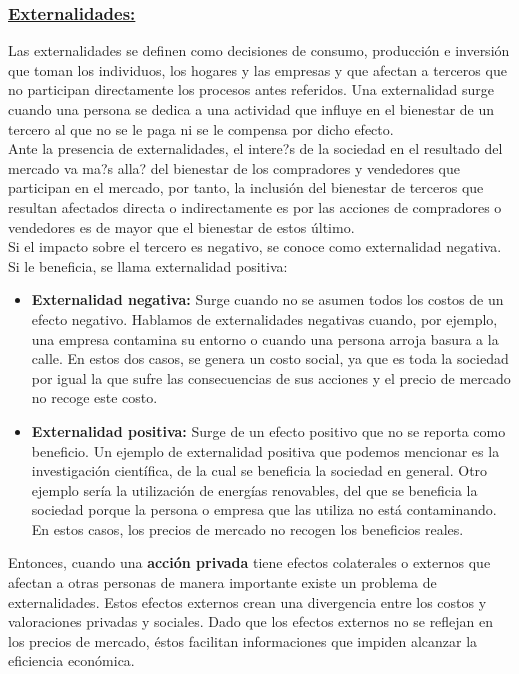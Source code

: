 \subsubsection{\textcolor[rgb]{0,0,0.55}{\underline{{\normalsize Externalidades:}}}}

Las externalidades se definen como decisiones de consumo, producción e inversión que toman los individuos, los hogares y las empresas y que afectan a terceros que no participan directamente los procesos antes referidos. Una externalidad surge cuando una persona se dedica a una actividad que influye en el bienestar de un tercero al que no se le paga ni se le compensa por dicho efecto.\\

Ante la presencia de externalidades, el intere?s de la sociedad en el resultado del mercado va ma?s alla? del bienestar de los compradores y vendedores que participan en el mercado, por tanto, la inclusión del bienestar de terceros que resultan afectados directa o indirectamente es por las acciones de compradores o vendedores es de mayor que el bienestar de estos último.\\

Si el impacto sobre el tercero es negativo, se conoce como externalidad negativa. Si le beneficia, se llama externalidad positiva:

\begin{itemize}
	\item     \textbf{Externalidad negativa:} Surge cuando no se asumen todos los costos de un efecto negativo. Hablamos de externalidades negativas cuando, por ejemplo, una empresa contamina su entorno o cuando una persona arroja basura a la calle. En estos dos casos, se genera un costo social, ya que es toda la sociedad por igual la que sufre las consecuencias de sus acciones y el precio de mercado no recoge este costo.
	\item \textbf{Externalidad positiva:} Surge de un efecto positivo que no se reporta como beneficio. Un ejemplo de externalidad positiva que podemos mencionar es la investigación científica, de la cual se beneficia la sociedad en general. Otro ejemplo sería la utilización de energías renovables, del que se beneficia la sociedad porque la persona o empresa que las utiliza no está contaminando. En estos casos, los precios de mercado no recogen los beneficios reales.
\end{itemize}

Entonces, cuando una \textbf{acción privada} tiene efectos colaterales o externos que afectan a otras personas de manera importante existe un problema de externalidades. Estos efectos externos crean una divergencia entre los costos y valoraciones privadas y sociales. Dado que los efectos externos no se reflejan en los precios de mercado, éstos facilitan informaciones que impiden alcanzar la eficiencia económica.

